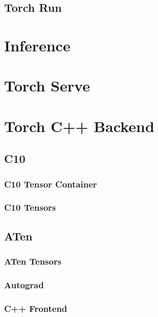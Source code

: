     \subsection*{Torch Run}
        

\section*{Inference}
  \section*{Torch Serve}

\newpage
\section*{Torch C++ Backend}
  \subsection*{C10}
      
      \subsubsection{C10 Tensor Container}\label{subsubsec:c10_tensors}
        
      \subsubsection{C10 Tensors}\label{subsubsec:c10_tensors}
        
  \subsection*{ATen}\label{subsec:aten}
      
      \subsubsection{ATen Tensors\hfill\normalsize{}}\label{subsubsubsec:aten_tensors}
        
      \subsubsection*{Autograd}\label{subsec:autograd}
      \subsubsection*{C++ Frontend}\label{subsec:c++_frontend}
